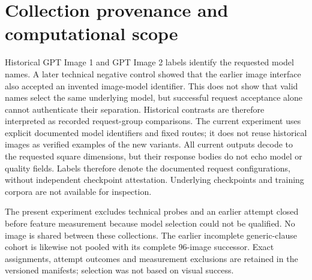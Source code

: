 \documentclass[11pt]{article}
\begin{document}
\section{Collection provenance and computational scope}\label{app:provenance}
Historical GPT Image 1 and GPT Image 2 labels identify the requested model
names. A later technical negative control showed that the earlier image
interface also accepted an invented image-model identifier. This does not show
that valid names select the same underlying model, but successful request
acceptance alone cannot authenticate their separation. Historical contrasts
are therefore interpreted as recorded request-group comparisons. The current
experiment uses explicit documented model identifiers and fixed routes;
it does not reuse historical images as verified examples of the new variants.
All current outputs decode to the requested square dimensions, but their
response bodies do not echo model or quality fields. Labels therefore denote
the documented request configurations, without independent checkpoint
attestation. Underlying checkpoints and training corpora are not available
for inspection.

The present experiment excludes technical probes and an earlier attempt closed
before feature measurement because model selection could not be qualified.
No image is shared between these collections. The earlier incomplete
generic-clause cohort is likewise not pooled with its complete 96-image
successor. Exact assignments, attempt outcomes and measurement exclusions are
retained in the versioned manifests; selection was not based on visual success.
\end{document}
